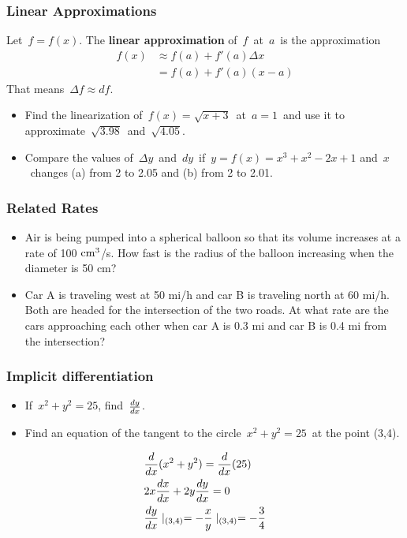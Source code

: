  \begin{frame}[fragile] \frametitle{Linear Approximations}
Let\ $f=f(x)$. The {\bf linear approximation} of\ $f$\ at\ $a$\ is the approximation
{\begin{align*}
 f(x) &\approx f(a) + f'(a) \Delta x \\
 &=f(a)+ f'(a)(x-a)
\end{align*}
} That means\ $\Delta f \approx df$.

\begin{itemize}
	\item Find the linearization of\ $f(x)=\sqrt{x+3}$\ at\ $a=1$\ and use it to approximate\ $\sqrt{3.98}$\ and\ $\sqrt{4.05}$.  
	\item Compare the values of\ $\Delta y$\ and\ $dy$\ if\ $y=f(x)=x^3+x^2-2x+1$
	and\ $x$\ changes (a) from 2 to 2.05 and (b) from 2 to 2.01.
\end{itemize}

\end{frame}

 \begin{frame}[fragile] \frametitle{Related Rates}

\begin{itemize}
	\item Air is being pumped into a spherical balloon so that its volume increases at a rate of 100 ${\rm cm}^3$/s. How fast is the radius of the balloon increasing when the diameter is 50 cm?
	\item Car A is traveling west at 50 mi/h and car B is traveling north at 60 mi/h. Both are headed for the intersection of the two roads. At what rate are the cars approaching each other when car A is 0.3 mi and car B is 0.4 mi from the intersection?  
\end{itemize}
\end{frame}

 \begin{frame}[fragile] \frametitle{Implicit differentiation}

\begin{itemize}
	\item If\ $x^2+y^2=25$, find\ $\frac{d {y} }{d x}$.
	\item Find an equation of the tangent to the circle\ $x^2+y^2=25$\ at the point (3,4).
\end{itemize}



\begin{align*}
 &\frac{d {} }{d x} (x^2+y^2) = \frac{d {} }{d x} (25) \\
 &2x \frac{d {x} }{d x} + 2y \frac{d {y} }{d x} = 0  \\
 &\frac{d {y} }{d x} \mid_{(3,4)} = - \dfrac {x}{y} \mid_{(3,4)} = - \frac{3}{4}
\end{align*}

\end{frame}

